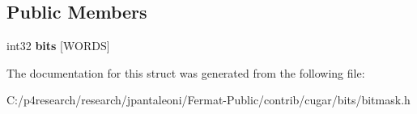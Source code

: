\subsection*{Public Members}
\begin{DoxyCompactItemize}
\item 
\mbox{\label{structcugar_1_1_bitmask_af3dd48f7334888b7a31d0d4d234c57b3}} 
int32 {\bfseries bits} \mbox{[}W\+O\+R\+DS\mbox{]}
\end{DoxyCompactItemize}


The documentation for this struct was generated from the following file\+:\begin{DoxyCompactItemize}
\item 
C\+:/p4research/research/jpantaleoni/\+Fermat-\/\+Public/contrib/cugar/bits/bitmask.\+h\end{DoxyCompactItemize}
